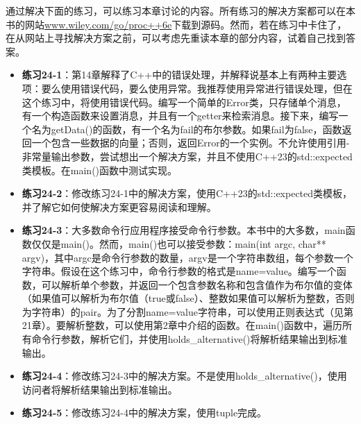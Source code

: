 通过解决下面的练习，可以练习本章讨论的内容。所有练习的解决方案都可以在本书的网站\url{www.wiley.com/go/proc++6e}下载到源码。然而，若在练习中卡住了，在从网站上寻找解决方案之前，可以考虑先重读本章的部分内容，试着自己找到答案。

\begin{itemize}
\item
\textbf{练习24-1}：第14章解释了C++中的错误处理，并解释说基本上有两种主要选项：要么使用错误代码，要么使用异常。我推荐使用异常进行错误处理，但在这个练习中，将使用错误代码。编写一个简单的Error类，只存储单个消息，有一个构造函数来设置消息，并且有一个getter来检索消息。接下来，编写一个名为getData()的函数，有一个名为fail的布尔参数。如果fail为false，函数返回一个包含一些数据的向量；否则，返回Error的一个实例。不允许使用引用-非常量输出参数，尝试想出一个解决方案，并且不使用C++23的std::expected类模板。在main()函数中测试实现。

\item
\textbf{练习24-2}：修改练习24-1中的解决方案，使用C++23的std::expected类模板，并了解它如何使解决方案更容易阅读和理解。

\item
\textbf{练习24-3}：大多数命令行应用程序接受命令行参数。本书中的大多数，main函数仅仅是main()。然而，main()也可以接受参数：main(int argc, char** argv)，其中argc是命令行参数的数量，argv是一个字符串数组，每个参数一个字符串。假设在这个练习中，命令行参数的格式是name=value。编写一个函数，可以解析单个参数，并返回一个包含参数名称和包含值作为布尔值的变体（如果值可以解析为布尔值（true或false）、整数如果值可以解析为整数，否则为字符串）的pair。为了分割name=value字符串，可以使用正则表达式（见第21章）。要解析整数，可以使用第2章中介绍的函数。在main()函数中，遍历所有命令行参数，解析它们，并使用holds\_alternative()将解析结果输出到标准输出。

\item
\textbf{练习24-4}：修改练习24-3中的解决方案。不是使用holds\_alternative()，使用访问者将解析结果输出到标准输出。

\item
\textbf{练习24-5}：修改练习24-4中的解决方案，使用tuple完成。
\end{itemize}


